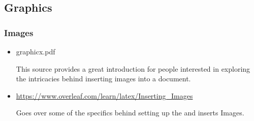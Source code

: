\documentclass[12pt,hidelinks]{article}
\begin{document}
	\subsection{Graphics}
		\subsubsection{Images}
			\begin{itemize}
				\item graphicx.pdf
					\begin{absquote}
						This source provides a great introduction for people interested in exploring the intricacies behind inserting images into a document.
					\end{absquote}
				\item \url{https://www.overleaf.com/learn/latex/Inserting_Images}
					\begin{absquote}
						Goes over some of the specifics behind setting up the  and inserts Images.
					\end{absquote}
			\end{itemize}
\end{document}
